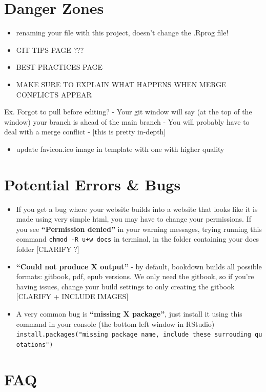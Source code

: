\documentclass[
]{book}
\providecommand{\tightlist}{%
  \setlength{\itemsep}{0pt}\setlength{\parskip}{0pt}}
\theoremstyle{definition}
\theoremstyle{definition}
\theoremstyle{definition}
\theoremstyle{definition}
\theoremstyle{remark}
\begin{document}
\section{Danger Zones}\label{danger-zones}

\begin{itemize}
\item
  renaming your file with this project, doesn't change the .Rprog file!
\item
  GIT TIPS PAGE ???
\item
  BEST PRACTICES PAGE
\item
  MAKE SURE TO EXPLAIN WHAT HAPPENS WHEN MERGE CONFLICTS APPEAR
\end{itemize}

Ex. Forgot to pull before editing?
- Your git window will say (at the top of the window) your branch is ahead of the main branch
- You will probably have to deal with a merge conflict
- {[}this is pretty in-depth{]}

\begin{itemize}
\tightlist
\item
  update favicon.ico image in template with one with higher quality
\end{itemize}

\section{Potential Errors \& Bugs}\label{potential-errors-bugs}

\begin{itemize}
\item
  If you get a bug where your website builds into a website that looks like it is made using very simple html, you may have to change your permissions. If you see \textbf{``Permission denied''} in your warning messages, trying running this command \texttt{chmod\ -R\ u+w\ docs} in terminal, in the folder containing your docs folder {[}CLARIFY ?{]}
\item
  \textbf{``Could not produce X output''} - by default, bookdown builds all possible formats: gitbook, pdf, epub versions. We only need the gitbook, so if you're having issues, change your build settings to only creating the gitbook {[}CLARIFY + INCLUDE IMAGES{]}
\item
  A very common bug is \textbf{``missing X package''}, just install it using this command in your console (the bottom left window in RStudio) \texttt{install.packages("missing\ package\ name,\ include\ these\ surrouding\ quotations")}
\end{itemize}

\section{FAQ}\label{faq}

  
\end{document}
